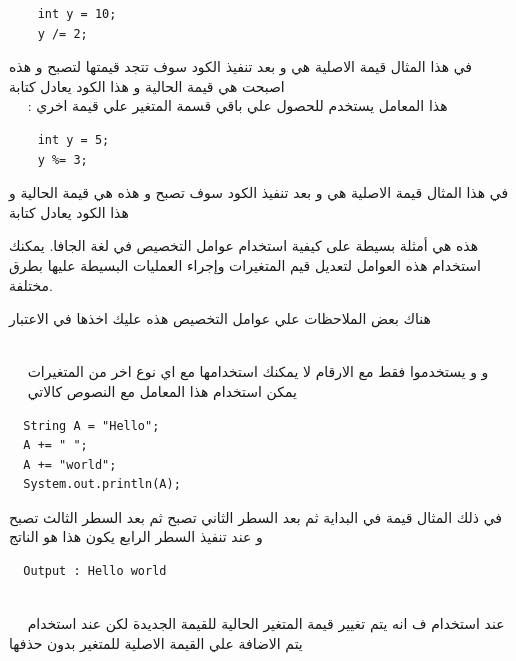   \begin{verbatim}
    int y = 10;
    y /= 2;
  \end{verbatim}
  \begin{AR}
    في هذا المثال قيمة  الاصلية هي  و بعد تنفيذ الكود  سوف تتجد قيمتها لتصبح  و هذه اصبحت هي قيمة  الحالية
    و هذا الكود يعادل كتابة 
    \\
    \ \ \LR{\textcolor{theme}{- 6}} \LR{(\%=)} : هذا المعامل يستخدم للحصول علي باقي قسمة المتغير علي قيمة اخري
  \end{AR}
  \begin{verbatim}
    int y = 5;
    y %= 3;
  \end{verbatim}
  \begin{AR}
    في هذا المثال قيمة  الاصلية هي  و بعد تنفيذ الكود  سوف تصبح  و هذه هي قيمة  الحالية
    و هذا الكود يعادل كتابة 


    هذه هي أمثلة بسيطة على كيفية استخدام عوامل التخصيص في لغة الجافا. يمكنك استخدام هذه العوامل لتعديل قيم المتغيرات وإجراء العمليات البسيطة عليها بطرق مختلفة.

    هناك بعض الملاحظات علي عوامل التخصيص هذه عليك اخذها في الاعتبار 

\\
\ \ \LR{\textcolor{theme}{- 1}}    \LR{(-=)} و \LR{(*=)} و \LR{(/=)} \LR{(\%=)} يستخدموا فقط مع الارقام لا يمكنك استخدامها مع اي نوع اخر من المتغيرات 
\\
\ \ \LR{\textcolor{theme}{- 2}}    \LR{(+=)} يمكن استخدام هذا المعامل مع النصوص كالاتي 
\end{AR}
\begin{verbatim}
  String A = "Hello";
  A += " ";
  A += "world";
  System.out.println(A);
\end{verbatim}
\begin{AR}
  في ذلك المثال قيمة  في البداية  ثم بعد السطر الثاني تصبح  ثم بعد السطر الثالث تصبح  و عند تنفيذ السطر الرابع يكون هذا هو الناتج 
\end{AR}
\begin{verbatim}
  Output : Hello world
\end{verbatim}
\begin{AR}  
\\
\ \ \LR{\textcolor{theme}{- 3}}    عند استخدام \LR{(=)} ف انه يتم تغيير قيمة المتغير الحالية للقيمة الجديدة لكن عند استخدام \LR{(+=)} يتم الاضافة علي القيمة الاصلية للمتغير بدون حذفها 
\end{AR}
